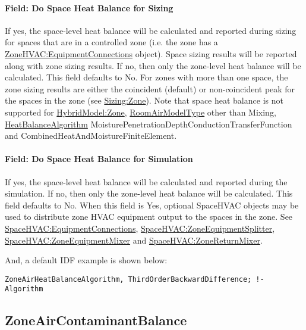 \paragraph{Field: Do Space Heat Balance for Sizing}\label{field-do-space-heat-balance-sizing}
If yes, the space-level heat balance will be calculated and reported during sizing for spaces that are in a controlled zone (i.e. the zone has a \hyperref[zonehvacequipmentconnections]{ZoneHVAC:EquipmentConnections} object). Space sizing results will be reported along with zone sizing results. If no, then only the zone-level heat balance will be calculated. This field defaults to No. For zones with more than one space, the zone sizing results are either the coincident (default) or non-coincident peak for the spaces in the zone (see \hyperref[field-type-of-space-sum-to-use]{Sizing:Zone}). Note that space heat balance is not supported for \hyperref[inputs-hm]{HybridModel:Zone}, \hyperref[roomairmodeltype]{RoomAirModelType} other than Mixing, \hyperref[heatbalancealgorithm]{HeatBalanceAlgorithm} MoisturePenetrationDepthConductionTransferFunction and CombinedHeatAndMoistureFiniteElement.

\paragraph{Field: Do Space Heat Balance for Simulation}\label{field-do-space-heat-balance-simulation}
If yes, the space-level heat balance will be calculated and reported during the simulation. If no, then only the zone-level heat balance will be calculated. This field defaults to No. When this field is Yes, optional SpaceHVAC objects may be used to distribute zone HVAC equipment output to the spaces in the zone. See \hyperref[spacehvacequipmentconnections]{SpaceHVAC:EquipmentConnections}, \hyperref[spacehvaczoneequipmentsplitter]{SpaceHVAC:ZoneEquipmentSplitter}, \hyperref[spacehvaczoneequipmentmixer]{SpaceHVAC:ZoneEquipmentMixer} and \hyperref[spacehvaczonereturnmixer]{SpaceHVAC:ZoneReturnMixer}.

And, a default IDF example is shown below:

\begin{lstlisting}
ZoneAirHeatBalanceAlgorithm, ThirdOrderBackwardDifference; !- Algorithm
\end{lstlisting}

\subsection{ZoneAirContaminantBalance}\label{zoneaircontaminantbalance}

